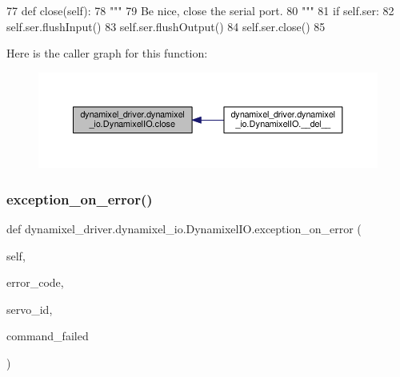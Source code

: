 \begin{DoxyCode}
77     \textcolor{keyword}{def }close(self):
78         \textcolor{stringliteral}{"""}
79 \textcolor{stringliteral}{        Be nice, close the serial port.}
80 \textcolor{stringliteral}{        """}
81         \textcolor{keywordflow}{if} self.ser:
82             self.ser.flushInput()
83             self.ser.flushOutput()
84             self.ser.close()
85 
\end{DoxyCode}
Here is the caller graph for this function\+:
\nopagebreak
\begin{figure}[H]
\begin{center}
\leavevmode
\includegraphics[width=350pt]{dd/d77/classdynamixel__driver_1_1dynamixel__io_1_1_dynamixel_i_o_a4cdcd3496e76197fc4d5f23ccd7daf26_icgraph}
\end{center}
\end{figure}
\mbox{\label{classdynamixel__driver_1_1dynamixel__io_1_1_dynamixel_i_o_a2276d95fa505e09758d500731edf5753}} 
\subsubsection{\texorpdfstring{exception\+\_\+on\+\_\+error()}{exception\_on\_error()}}
{\footnotesize\ttfamily def dynamixel\+\_\+driver.\+dynamixel\+\_\+io.\+Dynamixel\+I\+O.\+exception\+\_\+on\+\_\+error (\begin{DoxyParamCaption}\item[{}]{self,  }\item[{}]{error\+\_\+code,  }\item[{}]{servo\+\_\+id,  }\item[{}]{command\+\_\+failed }\end{DoxyParamCaption})}



